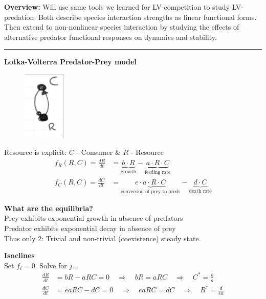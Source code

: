 \documentclass{article}
\newcommand{\ind}{\-\hspace{1cm}}
\begin{document}
\noindent{}
\textbf{Overview:} Will use same tools we learned for LV-competition to study LV-predation.  Both describe species interaction strengths as linear functional forms.  Then extend to non-nonlinear species interaction by studying the effects of alternative predator functional responses on dynamics and stability.

\rule[0.5ex]{\linewidth}{1pt}

\textbf{Lotka-Volterra Predator-Prey model}

\begin{figure}
	\includegraphics[width=2cm]{figs/CR_digraph.pdf}
\end{figure}
Resource is explicit:  $C$ - Consumer \& $R$ - Resource
\begin{align*}
	f_R(R,C)=\frac{dR}{dt} &= \underbrace{b \cdot R}_{\text{growth}} - \underbrace{a \cdot R \cdot C}_{\text{feeding rate}}\\
	f_C(R,C)=\frac{dC}{dt} &= \underbrace{e \cdot a \cdot R \cdot C}_{\text{conversion of prey to preds}} - \underbrace{d \cdot C}_{\text{death rate}}
\end{align*}

\textbf{What are the equilibria?}\\
\ind Prey exhibits exponential growth in absence of predators\\
\ind Predator exhibits exponential decay in absence of prey\\
\ind \ind Thus only 2:  Trivial and non-trivial (coexistence) steady state.

\textbf{Isoclines}\\
Set $f_i=0$.  Solve for $j$...
\begin{align*}
	\frac{dR}{dt} & =bR-aRC=0 \quad \Rightarrow \quad bR=aRC \quad \Rightarrow \quad C^*=\frac{b}{a}\\
	\frac{dC}{dt} & = eaRC-dC=0 \quad \Rightarrow \quad eaRC=dC \quad \Rightarrow \quad R^*=\frac{d}{ea}
\end{align*}
\end{document}
